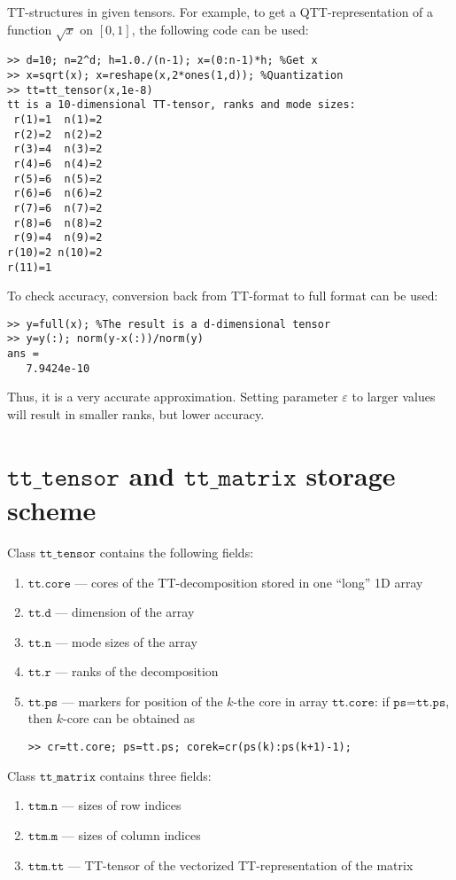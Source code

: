 \documentclass[a4paper,12pt,twoside]{article}
\def\tt{\texttt{tt\_tensor}}
\def\ttm{\texttt{tt\_matrix}}
\begin{document}
TT-structures in given tensors.
 For example, to get a QTT-representation of a function $\sqrt{x}$
on $[0,1]$, the following code can be used:
\begin{lstlisting}
>> d=10; n=2^d; h=1.0./(n-1); x=(0:n-1)*h; %Get x
>> x=sqrt(x); x=reshape(x,2*ones(1,d)); %Quantization
>> tt=tt_tensor(x,1e-8)
tt is a 10-dimensional TT-tensor, ranks and mode sizes: 
 r(1)=1  n(1)=2
 r(2)=2  n(2)=2
 r(3)=4  n(3)=2
 r(4)=6  n(4)=2
 r(5)=6  n(5)=2
 r(6)=6  n(6)=2
 r(7)=6  n(7)=2
 r(8)=6  n(8)=2
 r(9)=4  n(9)=2
r(10)=2 n(10)=2
r(11)=1        
\end{lstlisting}
To check accuracy, conversion back from TT-format to full format can be used:
\begin{lstlisting}
>> y=full(x); %The result is a d-dimensional tensor 
>> y=y(:); norm(y-x(:))/norm(y)
ans =
   7.9424e-10
\end{lstlisting}
Thus, it is a very accurate approximation. Setting parameter $\varepsilon$ to larger values will
result in smaller ranks, but lower accuracy.

\section{$\tt$ and $\ttm$ storage scheme}
Class $\tt$ contains the following fields:
\begin{enumerate}
\item $\texttt{tt.core}$ --- cores of the TT-decomposition stored in one ``long'' 1D array
\item $\texttt{tt.d}$ --- dimension of the array
\item $\texttt{tt.n}$ --- mode sizes of the array
\item $\texttt{tt.r}$ --- ranks of the decomposition
\item $\texttt{tt.ps}$ --- markers for position of the $k$-the core in array $\texttt{tt.core}$: 
if $\texttt{ps=tt.ps}$, then $k$-core can be obtained as
\begin{lstlisting}
>> cr=tt.core; ps=tt.ps; corek=cr(ps(k):ps(k+1)-1);
\end{lstlisting}
\end{enumerate}
Class $\ttm$ contains three fields:
\begin{enumerate}
\item $\texttt{ttm.n}$ --- sizes of row indices
\item $\texttt{ttm.m}$ --- sizes of column indices
\item $\texttt{ttm.tt}$ --- TT-tensor of the vectorized TT-representation of the matrix 
\end{enumerate}
\end{document}
